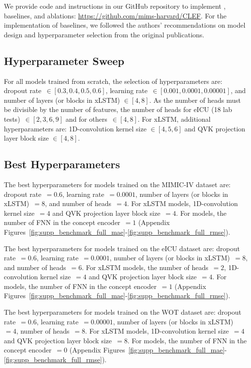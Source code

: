 We provide code and instructions in our GitHub repository to implement \name, baselines, and ablations: \url{https://github.com/mims-harvard/CLEF}. For the implementation of baselines, we followed the authors' recommendations on model design and hyperparameter selection from the original publications.


\subsection{Hyperparameter Sweep}

For all models trained from scratch, the selection of hyperparameters are: dropout rate~$\in [0.3, 0.4, 0.5, 0.6]$, learning rate~$\in [0.001, 0.0001, 0.00001]$, and number of layers (or blocks in xLSTM) $\in [4, 8]$. As the number of heads must be divisible by the number of features, the number of heads for eICU (18 lab tests)~$\in [2, 3, 6, 9]$ and for others~$\in [4, 8]$. For xLSTM, additional hyperparameters are: 1D-convolution kernel size $\in [4, 5, 6]$ and QVK projection layer block size $\in [4, 8]$.


\subsection{Best Hyperparameters}

 The best hyperparameters for models trained on the MIMIC-IV dataset are: dropout rate~$= 0.6$, learning rate~$= 0.0001$, number of layers (or blocks in xLSTM)~$= 8$, and number of heads~$= 4$. For xLSTM models, 1D-convolution kernel size~$= 4$ and QVK projection layer block size~$= 4$. For \name models, the number of FNN in the concept encoder~$= 1$ (Appendix Figures~\ref{fig:supp_benchmark_full_mae}-\ref{fig:supp_benchmark_full_rmse}).

 The best hyperparameters for  models trained on the eICU dataset are: dropout rate~$= 0.6$, learning rate~$= 0.0001$, number of layers (or blocks in xLSTM)~$= 8$, and number of heads~$= 6$. For xLSTM models, the number of heads~$= 2$, 1D-convolution kernel size~$= 4$ and QVK projection layer block size~$= 4$. For \name models, the number of FNN in the concept encoder~$= 1$ (Appendix Figures~\ref{fig:supp_benchmark_full_mae}-\ref{fig:supp_benchmark_full_rmse}).


 The best hyperparameters for  models trained on the WOT dataset are: dropout rate~$= 0.6$, learning rate~$= 0.00001$, number of layers (or blocks in xLSTM)~$= 4$, number of heads~$= 8$. For xLSTM models, 1D-convolution kernel size~$= 4$ and QVK projection layer block size~$= 8$. For \name models, the number of FNN in the concept encoder~$= 0$ (Appendix Figures~\ref{fig:supp_benchmark_full_mae}-\ref{fig:supp_benchmark_full_rmse}).



